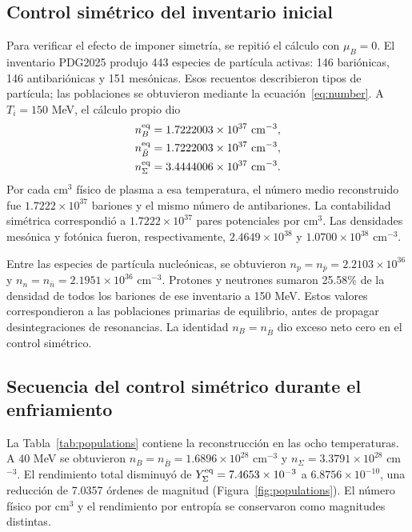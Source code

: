 

\subsection{Control simétrico del inventario inicial}
Para verificar el efecto de imponer simetría, se repitió el cálculo con $\mu_B=0$. El inventario PDG2025 produjo 443 especies de partícula activas: 146 bariónicas, 146 antibariónicas y 151 mesónicas. Esos recuentos describieron tipos de partícula; las poblaciones se obtuvieron mediante la ecuación~\eqref{eq:number}. A $T_i=150$ MeV, el cálculo propio dio
\begin{align}
n_B^{\rm eq}&=1.7222003\times10^{37}\ {\rm cm^{-3}},\\
n_{\bar B}^{\rm eq}&=1.7222003\times10^{37}\ {\rm cm^{-3}},\\
n_\Sigma^{\rm eq}&=3.4444006\times10^{37}\ {\rm cm^{-3}}.
\label{eq:initialpopulation}
\end{align}
Por cada cm$^3$ físico de plasma a esa temperatura, el número medio reconstruido fue $1.7222\times10^{37}$ bariones y el mismo número de antibariones. La contabilidad simétrica correspondió a $1.7222\times10^{37}$ pares potenciales por cm$^3$. Las densidades mesónica y fotónica fueron, respectivamente, $2.4649\times10^{38}$ y $1.0700\times10^{38}$ cm$^{-3}$.

Entre las especies de partícula nucleónicas, se obtuvieron $n_p=n_{\bar p}=2.2103\times10^{36}$ y $n_n=n_{\bar n}=2.1951\times10^{36}$ cm$^{-3}$. Protones y neutrones sumaron 25.58\% de la densidad de todos los bariones de ese inventario a 150 MeV. Estos valores correspondieron a las poblaciones primarias de equilibrio, antes de propagar desintegraciones de resonancias. La identidad $n_B=n_{\bar B}$ dio exceso neto cero en el control simétrico.

\subsection{Secuencia del control simétrico durante el enfriamiento}
La Tabla~\ref{tab:populations} contiene la reconstrucción en las ocho temperaturas. A 40 MeV se obtuvieron $n_B=n_{\bar B}=1.6896\times10^{28}$ cm$^{-3}$ y $n_\Sigma=3.3791\times10^{28}$ cm$^{-3}$. El rendimiento total disminuyó de $Y_\Sigma^{\rm eq}=7.4653\times10^{-3}$ a $6.8756\times10^{-10}$, una reducción de 7.0357 órdenes de magnitud (Figura~\ref{fig:populations}). El número físico por cm$^3$ y el rendimiento por entropía se conservaron como magnitudes distintas.


